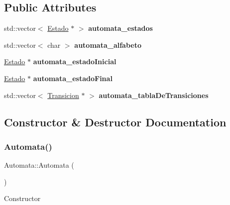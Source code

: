 \subsection*{Public Attributes}
\begin{DoxyCompactItemize}
\item 
\mbox{\label{class_automata_a1fd6b03f285f603487068124245cdf92}} 
std\+::vector$<$ \hyperlink{class_estado}{Estado} $\ast$ $>$ {\bfseries automata\+\_\+estados}
\item 
\mbox{\label{class_automata_af8729647a199dccc401cae627ce6c45c}} 
std\+::vector$<$ char $>$ {\bfseries automata\+\_\+alfabeto}
\item 
\mbox{\label{class_automata_a4943b6542bba80e61b748db0bf769313}} 
\hyperlink{class_estado}{Estado} $\ast$ {\bfseries automata\+\_\+estado\+Inicial}
\item 
\mbox{\label{class_automata_ae504d2338c97b59afbbe24a5d3119c73}} 
\hyperlink{class_estado}{Estado} $\ast$ {\bfseries automata\+\_\+estado\+Final}
\item 
\mbox{\label{class_automata_a1c95a0ef7a011e66cb6ee216b0bbbca6}} 
std\+::vector$<$ \hyperlink{class_transicion}{Transicion} $\ast$ $>$ {\bfseries automata\+\_\+tabla\+De\+Transiciones}
\end{DoxyCompactItemize}


\subsection{Constructor \& Destructor Documentation}
\mbox{\label{class_automata_ae13e4a7c4d7f0291c80b252a2510ebff}} 
\subsubsection{\texorpdfstring{Automata()}{Automata()}}
{\footnotesize\ttfamily Automata\+::\+Automata (\begin{DoxyParamCaption}{ }\end{DoxyParamCaption})}

Constructor 

